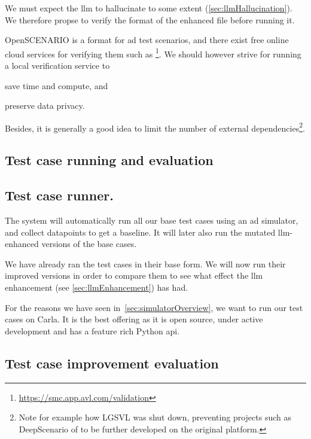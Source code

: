 We must expect the \acrshort{llm} to hallucinate to some extent (\cref{sec:llmHallucination}). We
therefore propse to verify the format of the enhanced file before running it.

OpenSCENARIO is a format for \acrshort{ad} test scenarios, and there exist free
online cloud services for verifying them such as
\footnote{\url{https://smc.app.avl.com/validation}}. We should however strive for
running a local verification service to \begin{inparaenum}
    \item save time and compute,
    and
    \item preserve data privacy.
\end{inparaenum}

Besides, it is generally a good idea to limit the number of external dependencies\footnote{Note for
    example how LGSVL\cite{lgsvl} was shut down, preventing projects such as DeepScenario of
    \citeauthor{DeepScenario} to be further developed on the original platform.}.

\subsection*{Test case running and evaluation}

\subsection{Test case runner.}

The system will automatically run all
our base test cases using an \acrshort{ad} simulator, and collect datapoints to get a baseline. It
will later also run the mutated \acrshort{llm}-enhanced versions of the base cases.

We have already ran the test cases in their base form. We will now run their
improved versions in order to compare them to see what effect the \acrshort{llm}
enhancement (see \cref{sec:llmEnhancement}) has had.

For the reasons we have seen in~\cref{sec:simulatorOverview}, we want to run our
test cases on Carla. It is the best offering as it is open source, under active
development and has a feature rich Python \acrshort{api}.

\subsection{Test case improvement evaluation}\label{sec:testCaseEval}

